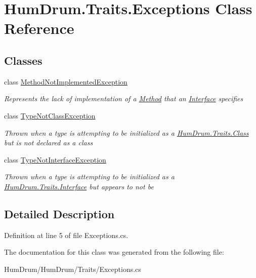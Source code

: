 \hypertarget{classHumDrum_1_1Traits_1_1Exceptions}{}\section{Hum\+Drum.\+Traits.\+Exceptions Class Reference}
\label{classHumDrum_1_1Traits_1_1Exceptions}
\subsection*{Classes}
\begin{DoxyCompactItemize}
\item 
class \hyperlink{classHumDrum_1_1Traits_1_1Exceptions_1_1MethodNotImplementedException}{Method\+Not\+Implemented\+Exception}
\begin{DoxyCompactList}\small\item\em Represents the lack of implementation of a \hyperlink{classHumDrum_1_1Traits_1_1Method}{Method} that an \hyperlink{classHumDrum_1_1Traits_1_1Interface}{Interface} specifies \end{DoxyCompactList}\item 
class \hyperlink{classHumDrum_1_1Traits_1_1Exceptions_1_1TypeNotClassException}{Type\+Not\+Class\+Exception}
\begin{DoxyCompactList}\small\item\em Thrown when a type is attempting to be initialized as a \hyperlink{classHumDrum_1_1Traits_1_1Class}{Hum\+Drum.\+Traits.\+Class} but is not declared as a class \end{DoxyCompactList}\item 
class \hyperlink{classHumDrum_1_1Traits_1_1Exceptions_1_1TypeNotInterfaceException}{Type\+Not\+Interface\+Exception}
\begin{DoxyCompactList}\small\item\em Thrown when a type is attempting to be initialized as a \hyperlink{classHumDrum_1_1Traits_1_1Interface}{Hum\+Drum.\+Traits.\+Interface} but appears to not be \end{DoxyCompactList}\end{DoxyCompactItemize}


\subsection{Detailed Description}


Definition at line 5 of file Exceptions.\+cs.



The documentation for this class was generated from the following file\+:\begin{DoxyCompactItemize}
\item 
Hum\+Drum/\+Hum\+Drum/\+Traits/Exceptions.\+cs\end{DoxyCompactItemize}
